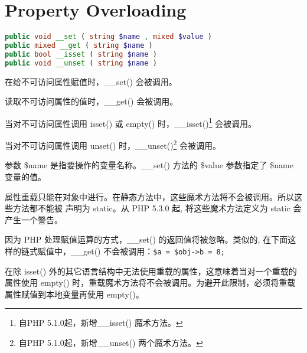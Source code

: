 \section{Property Overloading}


\begin{lstlisting}[language=PHP]
public void __set ( string $name , mixed $value )
public mixed __get ( string $name )
public bool __isset ( string $name )
public void __unset ( string $name )
\end{lstlisting}

在给不可访问属性赋值时，\_\_set() 会被调用。

读取不可访问属性的值时，\_\_get() 会被调用。

当对不可访问属性调用 isset() 或 empty() 时，\_\_isset()\footnote{自PHP 5.1.0起，新增\_\_isset() 魔术方法。} 会被调用。

当对不可访问属性调用 unset() 时，\_\_unset()\footnote{自PHP 5.1.0起，新增\_\_unset() 两个魔术方法。} 会被调用。

参数 \$name 是指要操作的变量名称。\_\_set() 方法的 \$value 参数指定了 \$name 变量的值。

属性重载只能在对象中进行。在静态方法中，这些魔术方法将不会被调用。所以这些方法都不能被 声明为 static。从 PHP 5.3.0 起, 将这些魔术方法定义为 static 会产生一个警告。

因为 PHP 处理赋值运算的方式，\_\_set() 的返回值将被忽略。类似的, 在下面这样的链式赋值中，\_\_get() 不会被调用：\verb|$a = $obj->b = 8; |


在除 isset() 外的其它语言结构中无法使用重载的属性，这意味着当对一个重载的属性使用 empty() 时，重载魔术方法将不会被调用。为避开此限制，必须将重载属性赋值到本地变量再使用 empty()。


